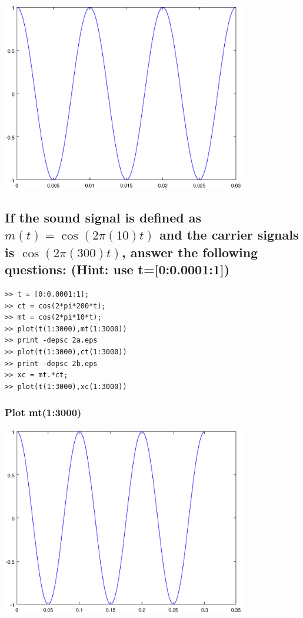 \documentclass[12pt,a4paper]{article}
\begin{document}
\includegraphics[width=0.8\textwidth]{b.eps}

\subsection{If the sound signal is defined as $m(t)=\cos(2\pi(10)t)$ and the carrier signals is $\cos(2\pi (300)t)$, answer the following questions: (Hint: use t=[0:0.0001:1])} 

\begin{lstlisting}
>> t = [0:0.0001:1];
>> ct = cos(2*pi*200*t);
>> mt = cos(2*pi*10*t);
>> plot(t(1:3000),mt(1:3000))
>> print -depsc 2a.eps
>> plot(t(1:3000),ct(1:3000))
>> print -depsc 2b.eps
>> xc = mt.*ct;
>> plot(t(1:3000),xc(1:3000))
\end{lstlisting}

\subsubsection{Plot mt(1:3000)}
\includegraphics[width=0.8\textwidth]{2a.eps}
\end{document}
